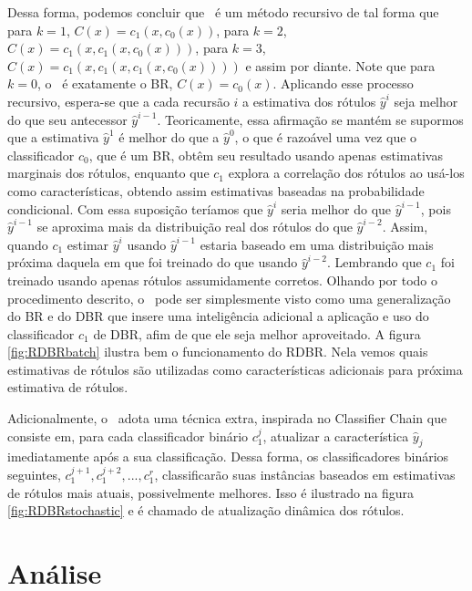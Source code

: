  Dessa forma, podemos concluir que \MRLM~é um método recursivo de tal forma que
 para $k=1$, $C(x)=c_1(x,c_0(x))$,
 para $k=2$, $C(x)=c_1(x,c_1(x,c_0(x)))$,
 para $k=3$, $C(x)=c_1(x,c_1(x,c_1(x,c_0(x))))$ e assim por diante.
 Note que para $k=0$, o \MRLMa~é exatamente o BR, $C(x)=c_0(x)$.
 Aplicando esse processo recursivo, espera-se que a cada recursão $i$ a estimativa dos rótulos $\hat{y}^i$ seja melhor do que
 seu antecessor $\hat{y}^{i-1}$. Teoricamente, essa afirmação se mantém se supormos que a estimativa $\hat{y}^1$ é melhor do que a $\hat{y}^0$, 
 o que é razoável uma vez que o classificador $c_0$, que é um BR, obtêm seu resultado usando apenas estimativas marginais dos rótulos,
  enquanto que $c_1$ explora a correlação dos rótulos ao usá-los como características, obtendo assim 
 estimativas baseadas na probabilidade condicional.
 Com essa suposição teríamos que $\hat{y}^i$ seria melhor do que $\hat{y}^{i-1}$, pois $\hat{y}^{i-1}$ se aproxima
 mais da distribuição real dos rótulos do que $\hat{y}^{i-2}$. Assim, quando $c_1$ estimar $\hat{y}^i$ usando $\hat{y}^{i-1}$ estaria baseado em 
 uma distribuição mais próxima daquela em que foi treinado do que usando $\hat{y}^{i-2}$.
 Lembrando que $c_1$ foi treinado usando apenas rótulos assumidamente corretos.
  Olhando por todo o procedimento descrito, o \MRLMa~pode ser simplesmente visto como uma generalização do BR e do DBR
 que insere uma inteligência
 adicional a aplicação e uso do classificador $c_1$ de DBR, afim de que ele seja melhor aproveitado.
 A figura \ref{fig:RDBRbatch} ilustra bem o funcionamento do RDBR.
 Nela vemos quais estimativas de rótulos são utilizadas como características adicionais
 para próxima estimativa de rótulos.
 
  Adicionalmente, o \MRLMa~adota uma técnica extra, inspirada no Classifier Chain que consiste em, para
 cada classificador binário $c_1^j$, atualizar a característica $\hat{y}_j$ imediatamente após 
 a sua classificação. Dessa forma, os classificadores binários seguintes, $c_1^{j+1},c_1^{j+2},...,c_1^{r}$,
 classificarão suas instâncias baseados em estimativas de rótulos mais atuais, possivelmente melhores.
 Isso é ilustrado na figura \ref{fig:RDBRstochastic} e é chamado de atualização dinâmica dos rótulos.
 

 
 \section{Análise}
 \label{sec:mrlm_analise} 
 
